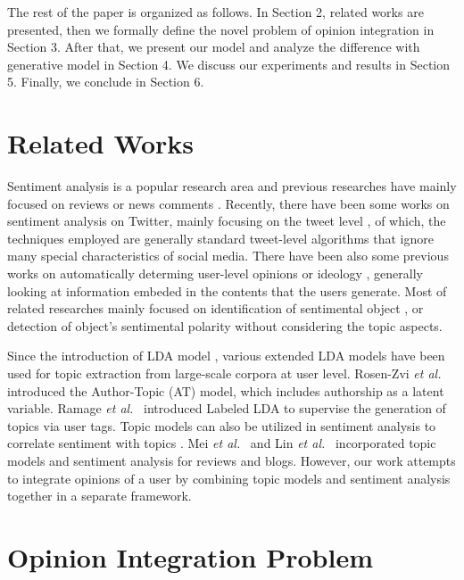 \documentclass[runningheads,a4paper]{llncs}
\begin{document}
The rest of the paper is organized as follows. In Section 2, related works are presented, then we formally define the novel problem of opinion integration in Section 3. After that, we present our model and analyze the difference with generative model in Section 4. We discuss our experiments and results in Section 5. Finally, we conclude in Section 6.

\section{Related Works}
\label{sec2}

Sentiment analysis is a popular research area and previous researches have mainly focused on reviews or news comments \cite{pang2008opinion,liu2012sentiment}. 
Recently, there have been some works on sentiment analysis on Twitter, mainly focusing on the tweet level \cite{barbosa2010robust,davidov2010enhanced,jiang2011target,li2010micro,tan2011user}, of which, the techniques employed are generally standard tweet-level algorithms that ignore many special characteristics of social media. There have been also some previous works on automatically determing user-level opinions or ideology \cite{agrawal2003mining,mostafa2013more,malouf2008taking,yu2008classifying}, generally looking at information embeded in the contents that the users generate. Most of related researches mainly focused on identification of sentimental object \cite{liu2010comment}, or detection of object’s sentimental polarity \cite{zhai2011constrained} without considering the topic aspects. 

Since the introduction of LDA model \cite{blei2003latent}, various extended LDA models have been used for topic extraction from large-scale corpora at user level. Rosen-Zvi \emph{et al.}~\cite{rosen2004author} introduced the Author-Topic (AT) model, which includes authorship as a latent variable. Ramage \emph{et al.}~\cite{ramage2009labeled} introduced Labeled LDA to supervise the generation of topics via user tags. Topic models can also be utilized in sentiment analysis to correlate sentiment with topics \cite{mei2007topic,lin2009joint}. Mei \emph{et al.}~\cite{mei2007topic} and Lin \emph{et al.}~\cite{lin2009joint} incorporated topic models and sentiment analysis for reviews and blogs. However, our work attempts to integrate opinions of a user by combining topic models and sentiment analysis together in a separate framework.

\section{Opinion Integration Problem}
\label{sec3}
\end{document}
